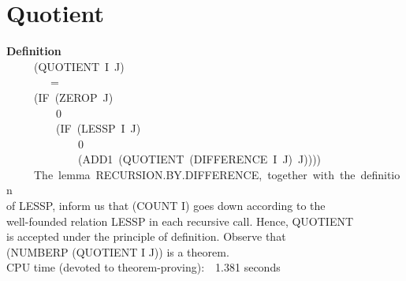 \documentclass[10pt]{book}
\newenvironment{pubasis}{\begin{flushleft}}{\end{flushleft}}
\newcommand{\axiomordefinition}[1]{\vspace{6pt}\Large\textsf{\textbf{#1}}\normalsize}
\begin{document}
\section{Quotient}
\begin{pubasis}
\axiomordefinition{Definition}\\
~~~~~(QUOTIENT~I~J)\\
~~~~~~~~=\\
~~~~~(IF~(ZEROP~J)\\
~~~~~~~~~0\\
~~~~~~~~~(IF~(LESSP~I~J)\\
~~~~~~~~~~~~~0\\
~~~~~~~~~~~~~(ADD1~(QUOTIENT~(DIFFERENCE~I~J)~J))))\\

~~~~~The~lemma~RECURSION.BY.DIFFERENCE,~together~with~the~definition\\
of LESSP, inform us that (COUNT I) goes down according to the\\
well-founded relation LESSP in each recursive call.  Hence, QUOTIENT\\
is accepted under the principle of definition.  Observe that\\
(NUMBERP (QUOTIENT I J)) is a theorem.\\

CPU time (devoted to theorem-proving):~~1.381 seconds\\
\end{pubasis}
\end{document}
